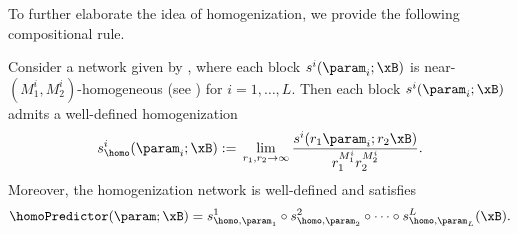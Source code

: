


To further elaborate the idea of homogenization, we provide the following compositional rule. 
\begin{theorem}\label{thm:block_compo_homogenization}
Consider a network given by , where each block $s^i (\param_i; \xB)$ is near-$(M_1^i, M_2^i)$-homogeneous (see ) for $i=1,\dots,L$.
Then each block $s^i (\param_i; \xB)$ admits a well-defined 
homogenization 
\begin{equation*}
s_{\homo}^i (\param_i; \xB) := \, \lim_{r_1, r_2 \to \infty} \frac{s^i (r_1 \param_i; r_2 \xB)}{r_1^{M_1^i} r_2^{M_2^i}}.
\end{equation*}
Moreover, the homogenization network  is well-defined and satisfies 
\begin{equation*}%
\homoPredictor (\param; \xB) = s_{\homo, \param_1}^1 \circ s_{\homo, \param_2}^2 \circ \cdots \circ s_{\homo, \param_L}^L (\xB).
\end{equation*}
\end{theorem}



